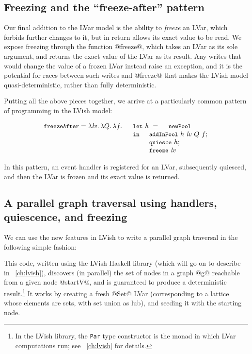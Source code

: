 \subsection{Freezing and the ``freeze-after'' pattern}\label{subsection:quasi-freeze-after}

Our final addition to the LVar model is the ability to \emph{freeze}
an LVar, which forbids further changes to it, but in return allows its
exact value to be read.  We expose freezing through the function
@freeze@, which takes an LVar as its sole argument, and returns the
exact value of the LVar as its result.  Any writes that would change
the value of a frozen LVar instead raise an exception, and it is the
potential for races between such writes and @freeze@ that makes the
LVish model quasi-deterministic, rather than fully deterministic.

Putting all the above pieces together, we arrive at a particularly
common pattern of programming in the LVish model:

\singlespacing
\[
\begin{array}[t]{l}
  \termfont{freezeAfter} = \lam{\mathit{lv}}{\lam{Q}{\lam{f}{}}}
  \begin{array}[t]{l}
    \termfont{let}~\mathit{h}~=~\NEWPOOL \\
    \termfont{in}
      \begin{array}[t]{l}  
        \ADDHANDLERINPOOL~h~\mathit{lv}~Q~f;
\\
        \QUIESCE~h;
\\
        \FREEZE~\mathit{lv}
      \end{array}
  \end{array}
\end{array}
\]
\doublespacing

In this pattern, an event handler is registered for an LVar,
subsequently quiesced, and then the LVar is frozen and its exact value
is returned.

\subsection{A parallel graph traversal using handlers, quiescence, and freezing}\label{subsection:quasi-parallel-graph-traversal}

We can use the new features in LVish to write a parallel graph
traversal in the following simple fashion:

\singlespacing

\doublespacing

This code, written using the LVish Haskell library (which  will go on
to describe in ~\ref{ch:lvish}), discovers (in parallel) the
set of nodes in a graph @g@ reachable from a given node @startV@, and
is guaranteed to produce a deterministic result.\footnote{In the LVish
  library, the \lstinline|Par| type constructor is the monad in which
  LVar computations run; see ~\ref{ch:lvish} for details.}  It
works by creating a fresh @Set@ LVar (corresponding to a lattice whose
elements are sets, with set union as lub), and seeding it with the
starting node.

